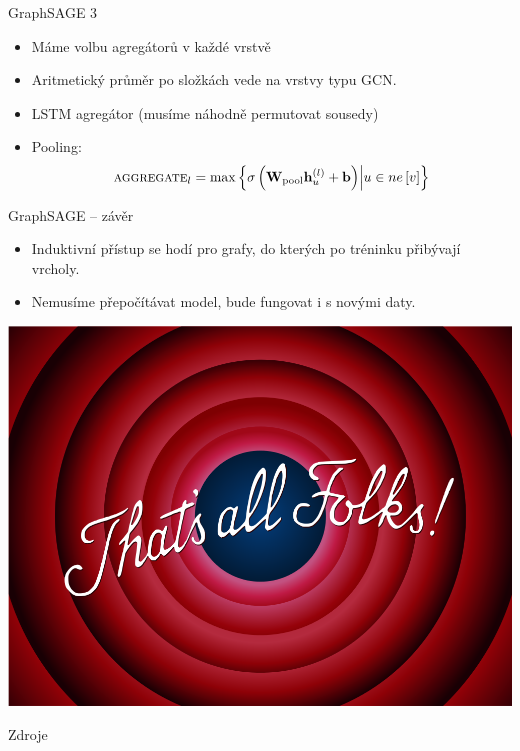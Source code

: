 \documentclass[10pt]{beamer}
\newcommand{\mathvec}{\ensuremath{\mathbf}}
\newcommand{\mathmat}{\ensuremath{\mathbf}}
\begin{document}
\begin{frame}{GraphSAGE 3}
	\begin{itemize}
		\item Máme volbu agregátorů v každé vrstvě
		\item Aritmetický průměr po složkách vede na vrstvy typu GCN.
		\item LSTM agregátor (musíme náhodně permutovat sousedy)
		\item Pooling:
			\[ \textsc{aggregate}_l = \max \left\{ \sigma \left( \mathmat{W}_{\mathrm{pool}} \mathvec{h}_u^{(l)} + \mathvec{b} \right) \middle| u \in ne \left[ v \right] \right\} \]
	\end{itemize}
\end{frame}

\begin{frame}{GraphSAGE -- závěr}
	\begin{itemize}
		\item Induktivní přístup se hodí pro grafy, do kterých po tréninku přibývají vrcholy.
		\item Nemusíme přepočítávat model, bude fungovat i s novými daty.
	\end{itemize}
\end{frame}

\begin{frame}
	\centering
	\includegraphics[width=0.75\pagewidth]{images/thats-all.png}
\end{frame}

\begin{frame}[allowframebreaks]{Zdroje}
	\printbibliography
\end{frame}
\end{document}
